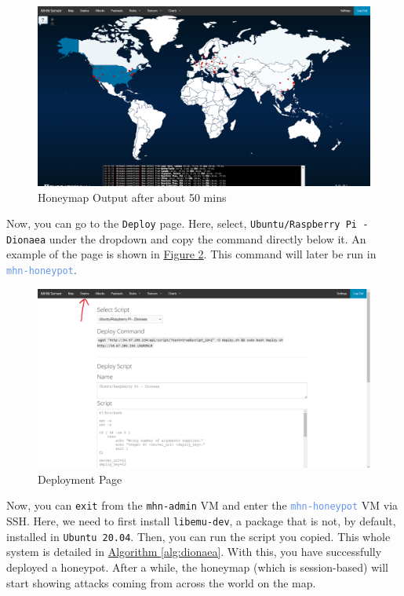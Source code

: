 \documentclass[12pt,usenames,dvipsnames]{iopart}
\newcommand{\reffig}[1]{\hyperref[#1]{Figure \ref*{#1}}}
\newcommand{\refalgo}[1]{\hyperref[#1]{Algorithm \ref*{#1}}}
\begin{document}
\begin{figure}[h]
    \centering
    \includegraphics[width=\textwidth]{images/honeymap.png}
    \caption{Honeymap Output after about 50 mins}
    \label{fig:honeymap}
\end{figure}

Now, you can go to the \texttt{Deploy} page. Here, select, \texttt{Ubuntu/Raspberry Pi - Dionaea} under the dropdown and copy the command directly below it. An example of the page is shown in \reffig{fig:deploy}. This command will later be run in \textcolor{CornflowerBlue}{\texttt{mhn-honeypot}}.

\begin{figure}[h]
    \centering
    \includegraphics[width=\textwidth]{images/deploy.png}
    \caption{Deployment Page}
    \label{fig:deploy}
\end{figure}

Now, you can \texttt{exit} from the \textcolor{CarnationPink}{\texttt{mhn-admin}} VM and enter the \textcolor{CornflowerBlue}{\texttt{mhn-honeypot}} VM via SSH. Here, we need to first install \texttt{libemu-dev}, a package that is not, by default, installed in \texttt{Ubuntu 20.04}. Then, you can run the script you copied. This whole system is detailed in \refalgo{alg:dionaea}. With this, you have successfully deployed a honeypot. After a while, the honeymap (which is session-based) will start showing attacks coming from across the world on the map.
\end{document}
